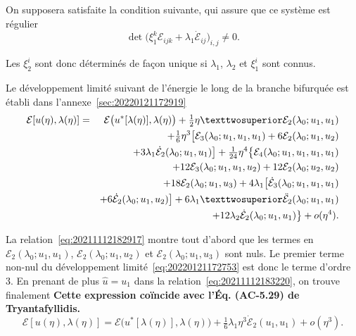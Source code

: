 \documentclass[12pt, final]{amsart}
\begin{document}
On supposera satisfaite la condition suivante, qui assure que ce système est régulier
\begin{equation}
  \det\bigl(\xi _1^k\mathcal E_{ijk}+\lambda _1\dot{\mathcal E}_{ij}\bigr)_{i,j}\neq0.
\end{equation}

Les \(\xi _2^i\) sont donc déterminés de façon unique si \(\lambda _1\), \(\lambda _2\) et \(\xi _1^i\)
sont connus.

Le développement limité suivant de l'énergie le long de la branche bifurquée
est établi dans l'annexe~\ref{sec:20220121172919}
\begin{eqnarray}
  \notag
  \mathcal E[u(\eta ), \lambda (\eta )]
  &=&\mathcal E\bigl(u^*[\lambda (\eta )], \lambda (\eta )\bigr)+\tfrac12\eta ²\mathcal E_2(\lambda _0; u_1, u_1)\\
  \notag
  &&+\tfrac16\eta ^3\bigl[\mathcal E_3(\lambda _0;u_1, u_1, u_1)+6\mathcal E_2(\lambda _0; u_1, u_2)\\
  \notag
  &&+3\lambda _1\dot{\mathcal E}_2(\lambda _0; u_1, u_1)\bigr]+\tfrac1{24}\eta ^4\bigl\{\mathcal E_4(\lambda _0;u_1, u_1, u_1, u_1)\\
  \notag
  &&+12\mathcal E_3(\lambda _0; u_1, u_1, u_2)+12\mathcal E_2(\lambda _0; u_2, u_2)\\
  \notag
  &&+18\mathcal E_2(\lambda _0; u_1, u_3)+4\lambda _1\bigl[\dot{\mathcal E}_3(\lambda _0; u_1, u_1, u_1)\\
  \notag
  &&+6\dot{\mathcal E}_2(\lambda _0; u_1, u_2)\bigr]+6\lambda _1²\ddot{\mathcal E}_2(\lambda _0; u_1, u_1)\\
  \label{eq:20220121172753}
  &&+12\lambda _2\dot{\mathcal E}_2(\lambda _0; u_1, u_1)\bigr\}+o(\eta ^4).
\end{eqnarray}

La relation~\eqref{eq:20211112182917} montre tout d'abord que les termes en
\(\mathcal E_2(\lambda _0; u_1, u_1)\), \(\mathcal E_2(\lambda _0; u_1, u_2)\) et \(\mathcal E_2(\lambda _0; u_1, u_3)\) sont nuls. Le
premier terme non-nul du développement limité~\eqref{eq:20220121172753} est
donc le terme d'ordre 3. En prenant de plus \(\hat{u}=u_1\) dans la
relation~\eqref{eq:20211112183220}, on trouve finalement \textbf{Cette
  expression coïncide avec l'Éq. (AC-5.29) de Tryantafyllidis.}
\begin{equation}
  \mathcal E[u(\eta ), \lambda (\eta )]=\mathcal E\bigl(u^*[\lambda (\eta )], \lambda (\eta )\bigr)+\tfrac16\lambda _1\eta ^3\dot{\mathcal E}_2(u_1, u_1)+o(\eta ^3).
\end{equation}
\end{document}
